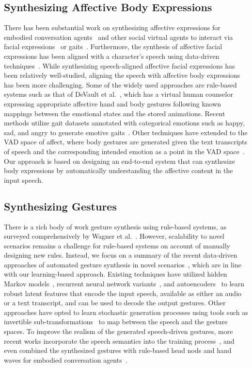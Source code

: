 \documentclass[conference,compsoc]{IEEEtran}
\theoremstyle{definition}
\begin{document}
\subsection{Synthesizing Affective Body Expressions}
There has been substantial work on synthesizing affective expressions for embodied conversation agents~\cite{verbal_comm1,verbal_comm2} and other social virtual agents to interact via facial expressions~\cite{expressive_face1,expressive_face2} or gaits~\cite{eva}. Furthermore, the synthesis of affective facial expressions has been aligned with a character's speech using data-driven techniques~\cite{automated_emotive_agents}. While synthesizing speech-aligned affective facial expressions has been relatively well-studied, aligning the speech with affective body expressions has been more challenging. Some of the widely used approaches are rule-based systems such as that of DeVault et al.~\cite{simsensei}, which has a virtual human counselor expressing appropriate affective hand and body gestures following known mappings between the emotional states and the stored animations. Recent methods utilize gait datasets annotated with categorical emotions such as happy, sad, and angry to generate emotive gaits~\cite{tanmay_emotions,gen_emo_gaits}. Other techniques have extended to the VAD space of affect, where body gestures are generated given the text transcripts of speech and the corresponding intended emotion as a point in the VAD space~\cite{t2g}. Our approach is based on designing an end-to-end system that can synthesize body expressions by automatically understanding the affective content in the input speech.

\subsection{Synthesizing Gestures}
There is a rich body of work gesture synthesis using rule-based systems, as surveyed comprehensively by Wagner et al.~\cite{rule_based_gestures}. However, scalability to novel scenarios remains a challenge for rule-based systems on account of manually designing new rules. Instead, we focus on a summary of the recent data-driven approaches of automated gesture synthesis in novel scenarios~\cite{dcnf}, which are in line with our learning-based approach. Existing techniques have utilized hidden Markov models~\cite{speech_hmm_gestures}, recurrent neural network variants~\cite{speech_LSTM_gestures,cospeech_gestures}, and autoencoders~\cite{speech_RepL_gestures} to learn robust latent features that encode the input speech, available as either an audio or a text transcript, and can be used to decode the output gestures. Other approaches have opted to learn stochastic generation processes using tools such as invertible sub-transformations~\cite{speech_flow_gestures} to map between the speech and the gesture spaces. To improve the realism of the generated speech-driven gestures, more recent works incorporate the speech semantics into the training process~\cite{gesticulator}, and even combined the synthesized gestures with rule-based head nods and hand waves for embodied conversation agents~\cite{prototypical_behaviors}.
\end{document}
